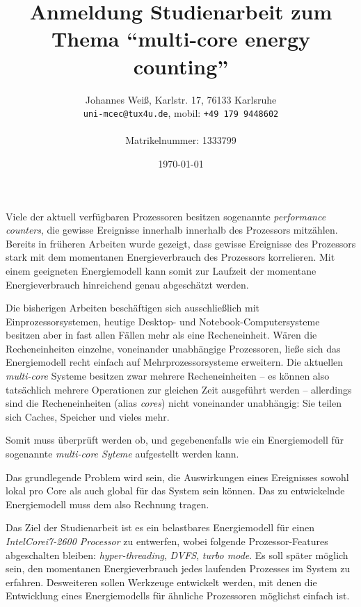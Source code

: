 \documentclass[a4paper,DIV=15]{scrartcl}
\newcommand{\JWemail}[1]{\texttt{#1}}
\newcommand{\JWphone}[1]{\texttt{#1}}
\newcommand{\JWemph}[1]{\emph{#1}}
\newcommand{\JWproduct}[1]{\JWemph{#1}}
\newcommand{\JWlone}[1]{\medskip}
\def\TReg{\textsuperscript{\textregistered}}
\def\TTra{\textsuperscript{\texttrademark}}
\begin{document}
\pagestyle{empty}

\title{Anmeldung Studienarbeit zum Thema "`multi-core energy counting"'}
\author{
  Johannes Weiß, Karlstr. 17, 76133 Karlsruhe\\
  \JWemail{uni-mcec@tux4u.de}, mobil: \JWphone{+49 179 9448602}\\
  \\
  Matrikelnummer: 1333799
}
\date{\today}
\maketitle
\thispagestyle{empty}
\pagestyle{empty}

\JWlone{Grundlagen}

Viele der aktuell verfügbaren Prozessoren besitzen sogenannte
\JWemph{performance counters}, die gewisse Ereignisse innerhalb innerhalb des
Prozessors mitzählen. Bereits in früheren Arbeiten wurde gezeigt, dass gewisse
Ereignisse des Prozessors stark mit dem momentanen Energieverbrauch des
Prozessors korrelieren. Mit einem geeigneten Energiemodell kann somit zur
Laufzeit der momentane Energieverbrauch hinreichend genau abgeschätzt werden.

\JWlone{Related Work}

Die bisherigen Arbeiten beschäftigen sich ausschließlich mit
Einprozessorsystemen, heutige Desktop- und Notebook-Computersysteme besitzen
aber in fast allen Fällen mehr als eine Recheneinheit. Wären die Recheneinheiten
einzelne, voneinander unabhängige Prozessoren, ließe sich das Energiemodell
recht einfach auf Mehrprozessorsysteme erweitern. Die aktuellen
\JWemph{multi-core} Systeme besitzen zwar mehrere Recheneinheiten -- es können
also tatsächlich mehrere Operationen zur gleichen Zeit ausgeführt werden --
allerdings sind die Recheneinheiten (alias \JWemph{cores}) nicht voneinander
unabhängig: Sie teilen sich Caches, Speicher und vieles mehr.

Somit muss überprüft werden ob, und gegebenenfalls wie ein Energiemodell für
sogenannte \JWemph{multi-core Syteme} aufgestellt werden kann.


\JWlone{Problem}

Das grundlegende Problem wird sein, die Auswirkungen eines Ereignisses sowohl
lokal pro Core als auch global für das System sein können. Das zu entwickelnde
Energiemodell muss dem also Rechnung tragen.

\JWlone{Ziele}

Das Ziel der Studienarbeit ist es ein belastbares Energiemodell für einen
\JWproduct{Intel\TReg Core\TTra i7-2600 Processor} zu
entwerfen, wobei folgende Prozessor-Features abgeschalten bleiben:
\JWemph{hyper-threading}, \JWemph{DVFS}, \JWemph{turbo mode}. Es soll später
möglich sein, den momentanen Energieverbrauch jedes laufenden Prozesses im
System zu erfahren. Desweiteren sollen Werkzeuge entwickelt werden, mit denen
die Entwicklung eines Energiemodells für ähnliche Prozessoren möglichst einfach
ist.
\end{document}
